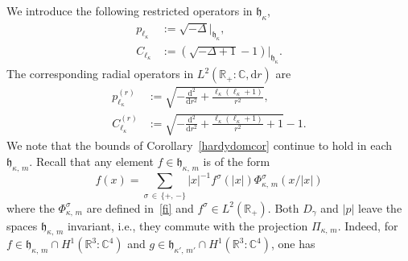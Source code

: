 \documentclass[AHL,Unicode,longabstracts,published]{cedram}
\newcommand*\rd{\mathrm{d}}
\newcommand*\dr{\mathrm{d}r}
\newcommand*\cz{\mathbb{C}}
\newcommand*\rz{\mathbb{R}}
\newcommand*\gh{\mathfrak{h}}
\begin{document}
We introduce the following restricted operators in $\gh_{\kappa}$,
\begin{align*}
p_{\ell_\kappa} & := \sqrt{-\Delta}|_{\gh_{\kappa}},\\
C_{\ell_\kappa} & := \left(\sqrt{-\Delta+1}-1\right)\big|_{\gh_{\kappa}}.
\end{align*}
The corresponding radial operators in $L^2(\rz_+:\cz,\dr)$ are
\begin{align}\label{eq:radialkinetic}
p_{\ell_\kappa}^{(r)} & := \sqrt{ - \frac{\rd^2}{\dr^2} + \frac{\ell_\kappa\left(\ell_\kappa+1\right)}{r^2}},\\
C_{\ell_\kappa}^{(r)} & :=\sqrt{- \frac{\rd^2}{\dr^2} + \frac{\ell_\kappa\left(\ell_\kappa+1\right)}{r^2} + 1}-1.
\end{align}
We note that the bounds of Corollary~\ref{hardydomcor} continue to hold in each $\gh_{\kappa,\,m}$. Recall that any element $f\in\gh_{\kappa,\,m}$ is of the form
\[
f(x)=\sum_{\sigma\,\in\,\{+,\,-\}} |x|^{-1} f^\sigma(|x|)\Phi_{\kappa,\,m}^\sigma(x/|x|)
\]
where the $\Phi_{\kappa,\,m}^\sigma$ are defined in~\eqref{fi} and $f^\sigma\in L^2(\rz_+)$. Both $D_\gamma$ and $|p|$ leave the spaces $\gh_{\kappa,\,m}$ invariant, i.e., they commute with the projection $\Pi_{\kappa,\,m}$. Indeed, for $f\in\gh_{\kappa,\,m}\cap H^{1}(\rz^3:\cz^4)$ and $g\in\gh_{\kappa',\,m'}\cap H^{1}(\rz^3:\cz^4)$, one has
\end{document}
